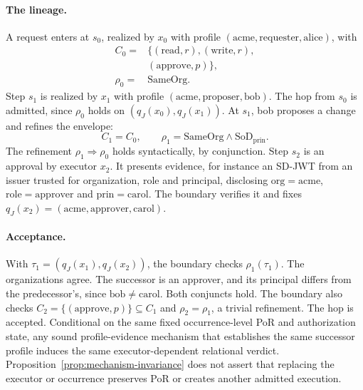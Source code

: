 \documentclass[10pt,twocolumn]{article}
\begin{document}
\paragraph{The lineage.}
A request enters at \(s_0\), realized by \(x_0\) with profile
\((\mathrm{acme},\mathrm{requester},\mathrm{alice})\), with
\[
\begin{aligned}
C_0={}&\{(\mathrm{read},r),(\mathrm{write},r),\\
&(\mathrm{approve},p)\},\\
\rho_0={}&\mathrm{SameOrg}.
\end{aligned}
\]
Step \(s_1\) is realized by \(x_1\) with profile
\((\mathrm{acme},\mathrm{proposer},\mathrm{bob})\). The hop from \(s_0\) is
admitted, since \(\rho_0\) holds on \((q_J(x_0),q_J(x_1))\). At \(s_1\), bob
proposes a change and refines the envelope:
\[
C_1=C_0,
\qquad
\rho_1=\mathrm{SameOrg}\land\mathrm{SoD}_{\mathrm{prin}}.
\]
The refinement \(\rho_1\Rightarrow\rho_0\) holds syntactically, by conjunction.
Step \(s_2\) is an approval by executor \(x_2\). It presents evidence, for
instance an SD-JWT from an issuer trusted for organization, role and principal,
disclosing \(\mathrm{org}=\mathrm{acme}\), \(\mathrm{role}=\mathrm{approver}\)
and \(\mathrm{prin}=\mathrm{carol}\). The boundary verifies it and fixes
\(q_J(x_2)=(\mathrm{acme},\mathrm{approver},\mathrm{carol})\).

\paragraph{Acceptance.}
With \(\tau_1=(q_J(x_1),q_J(x_2))\), the boundary checks \(\rho_1(\tau_1)\). The
organizations agree. The successor is an approver, and its principal differs from
the predecessor's, since \(\mathrm{bob}\neq\mathrm{carol}\). Both conjuncts
hold. The boundary also checks \(C_2=\{(\mathrm{approve},p)\}\subseteq C_1\)
and \(\rho_2=\rho_1\), a trivial refinement. The hop is accepted. Conditional
on the same fixed occurrence-level PoR and authorization state, any sound
profile-evidence mechanism that establishes the same successor profile induces
the same executor-dependent relational verdict.
Proposition~\ref{prop:mechanism-invariance} does not assert that replacing the
executor or occurrence preserves PoR or creates another admitted execution.
\end{document}
